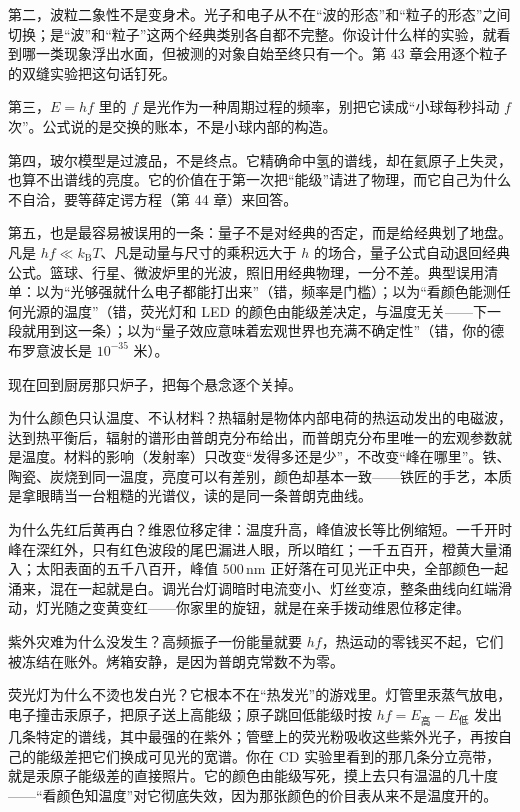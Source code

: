 第二，波粒二象性不是变身术。光子和电子从不在“波的形态”和“粒子的形态”之间切换；是“波”和“粒子”这两个经典类别各自都不完整。你设计什么样的实验，就看到哪一类现象浮出水面，但被测的对象自始至终只有一个。第 43 章会用逐个粒子的双缝实验把这句话钉死。

第三，\(E = hf\) 里的 \(f\) 是光作为一种周期过程的频率，别把它读成“小球每秒抖动 \(f\) 次”。公式说的是交换的账本，不是小球内部的构造。

第四，玻尔模型是过渡品，不是终点。它精确命中氢的谱线，却在氦原子上失灵，也算不出谱线的亮度。它的价值在于第一次把“能级”请进了物理，而它自己为什么不自洽，要等薛定谔方程（第 44 章）来回答。

第五，也是最容易被误用的一条：量子不是对经典的否定，而是给经典划了地盘。凡是 \(hf \ll k_{\mathrm{B}}T\)、凡是动量与尺寸的乘积远大于 \(h\) 的场合，量子公式自动退回经典公式。篮球、行星、微波炉里的光波，照旧用经典物理，一分不差。典型误用清单：以为“光够强就什么电子都能打出来”（错，频率是门槛）；以为“看颜色能测任何光源的温度”（错，荧光灯和 LED 的颜色由能级差决定，与温度无关——下一段就用到这一条）；以为“量子效应意味着宏观世界也充满不确定性”（错，你的德布罗意波长是 \(10^{-35}\) 米）。


现在回到厨房那只炉子，把每个悬念逐个关掉。

为什么颜色只认温度、不认材料？热辐射是物体内部电荷的热运动发出的电磁波，达到热平衡后，辐射的谱形由普朗克分布给出，而普朗克分布里唯一的宏观参数就是温度。材料的影响（发射率）只改变“发得多还是少”，不改变“峰在哪里”。铁、陶瓷、炭烧到同一温度，亮度可以有差别，颜色却基本一致——铁匠的手艺，本质是拿眼睛当一台粗糙的光谱仪，读的是同一条普朗克曲线。

为什么先红后黄再白？维恩位移定律：温度升高，峰值波长等比例缩短。一千开时峰在深红外，只有红色波段的尾巴漏进人眼，所以暗红；一千五百开，橙黄大量涌入；太阳表面的五千八百开，峰值 \(500\,\mathrm{nm}\) 正好落在可见光正中央，全部颜色一起涌来，混在一起就是白。调光台灯调暗时电流变小、灯丝变凉，整条曲线向红端滑动，灯光随之变黄变红——你家里的旋钮，就是在亲手拨动维恩位移定律。

紫外灾难为什么没发生？高频振子一份能量就要 \(hf\)，热运动的零钱买不起，它们被冻结在账外。烤箱安静，是因为普朗克常数不为零。

荧光灯为什么不烫也发白光？它根本不在“热发光”的游戏里。灯管里汞蒸气放电，电子撞击汞原子，把原子送上高能级；原子跳回低能级时按 \(hf = E_{\text{高}} - E_{\text{低}}\) 发出几条特定的谱线，其中最强的在紫外；管壁上的荧光粉吸收这些紫外光子，再按自己的能级差把它们换成可见光的宽谱。你在 CD 实验里看到的那几条分立亮带，就是汞原子能级差的直接照片。它的颜色由能级写死，摸上去只有温温的几十度——“看颜色知温度”对它彻底失效，因为那张颜色的价目表从来不是温度开的。


